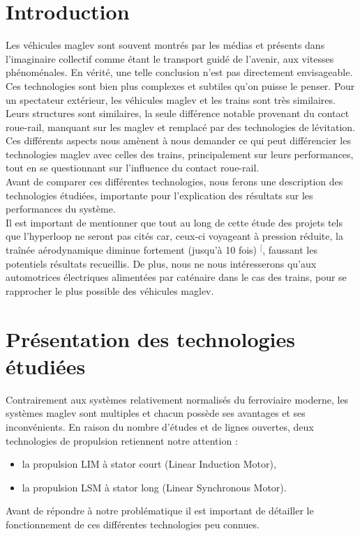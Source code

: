 \documentclass[12pt, a4paper, onecolumn]{article}
\makeatletter
\renewcommand{\tab}{\tabto{15px}}
\newcommand{\csvdel}{}
\newcommand{\bettercite}[1][,]{%
  \renewcommand{\csvdel}{\renewcommand{\csvdel}{}}%
  \csname\endcsname$^[$\checknextarg}
\newcommand{\checknextarg}{\@ifnextchar\bgroup{\gobblenext}{}}%
\newcommand{\gobblenext}[1]{\csvdel\textcolor{blue}{\textbf{\cite{#1}}}\@ifnextchar\bgroup{$^,$\gobblenext}{$^]$}}%
\makeatother
\begin{document}
\section*{Introduction} %
\tab Les véhicules maglev sont souvent montrés par les médias et présents dans l’imaginaire collectif comme étant le transport guidé de l’avenir, aux vitesses phénoménales.
En vérité, une telle conclusion n’est pas directement envisageable.
Ces technologies sont bien plus complexes et subtiles qu’on puisse le penser.
Pour un spectateur extérieur, les véhicules maglev et les trains sont très similaires.
Leurs structures sont similaires, la seule différence notable provenant du contact roue-rail, manquant sur les maglev et remplacé par des technologies de lévitation. \\
\linebreak
\tab Ces différents aspects nous amènent à nous demander ce qui peut différencier les technologies maglev avec celles des trains, principalement sur leurs performances, tout en se questionnant sur l’influence du contact roue-rail. \\
\tab Avant de comparer ces différentes technologies, nous ferons une description des technologies étudiées, importante pour l’explication des résultats sur les performances du système. \\
\linebreak
\tab Il est important de mentionner que tout au long de cette étude des projets tels que l’hyperloop ne seront pas cités car, ceux-ci voyageant à pression réduite, la traînée aérodynamique diminue fortement (jusqu'à 10 fois)\bettercite{maglevintube}, faussant les potentiels résultats recueillis.
De plus, nous ne nous intéresserons qu’aux automotrices électriques alimentées par caténaire dans le cas des trains, pour se rapprocher le plus possible des véhicules maglev. \\



\pagebreak %
\section{Présentation des technologies étudiées} %
\tab Contrairement aux systèmes relativement normalisés du ferroviaire moderne, les systèmes maglev sont multiples et chacun possède ses avantages et ses inconvénients.
En raison du nombre d'études et de lignes ouvertes, deux technologies de propulsion retiennent notre attention :
\begin{itemize}
  \item la propulsion LIM à stator court (Linear Induction Motor),
  \item la propulsion LSM à stator long (Linear Synchronous Motor).
\end{itemize}
\tab Avant de répondre à notre problématique il est important de détailler le fonctionnement de ces différentes technologies peu connues.
\end{document}
